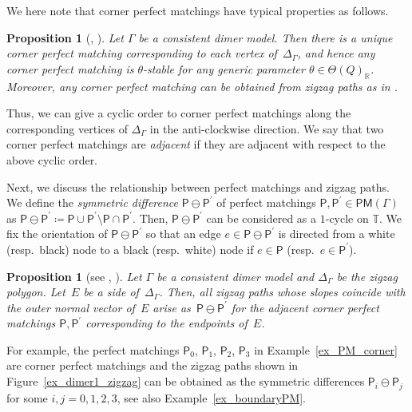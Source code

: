 \documentclass[10pt,a4paper]{amsart}
\numberwithin{equation}{section}
\newtheorem{Proposition}[Theorem]{Proposition}
\theoremstyle{definition}
\newcommand{\RR}{\mathbb{R}}
\newcommand{\TT}{\mathbb{T}}
\newcommand{\sfP}{\mathsf{P}}
\newcommand{\PM}{\mathsf{PM}}
\begin{document}
We here note that corner perfect matchings have typical properties as follows.

\begin{Proposition}[{\cite[Corollary~4.27]{Bro_dimer}, \cite[Proposition~9.2]{IU_special}}]
\label{prop_cPM_unique}
Let $\Gamma$ be a consistent dimer model.
Then there is a unique corner perfect matching corresponding to each vertex of~$\Delta_\Gamma$,
and hence any corner perfect matching is $\theta$-stable for any generic parameter $\theta\in\Theta(Q)_\RR$.
Moreover, any corner perfect matching can be obtained from zigzag paths as in {\rm \cite[\emph{Section}~8]{IU_special}}.
\end{Proposition}

Thus, we can give a cyclic order to corner perfect matchings along the corresponding vertices of $\Delta_\Gamma$ in the anti-clockwise direction.
We say that two corner perfect matchings are \emph{adjacent} if they are adjacent with respect to the above cyclic order.

Next, we discuss the relationship between perfect matchings and zigzag paths.
We define the \emph{symmetric difference} $\sfP\ominus\sfP^\prime$ of perfect matchings $\sfP, \sfP^\prime\in\PM(\Gamma)$ as
$\sfP\ominus\sfP^\prime\coloneqq\sfP\cup\sfP^\prime{\setminus}\sfP\cap\sfP^\prime$.
Then, $\sfP\ominus\sfP^\prime$ can be considered as a $1$-cycle on $\TT$.
We fix the orientation of $\sfP\ominus\sfP^\prime$ so that an edge $e\in \sfP\ominus\sfP^\prime$ is directed
from a white (resp.\ black) node to a black (resp.\ white) node if $e\in\sfP$ (resp.\ $e\in\sfP^\prime$).

\begin{Proposition} [{see \cite[Corollary~3.8]{Gul}, \cite[Step~1 of the proof of Proposition~9.2, Corollary~9.3]{IU_special}}]\label{zigzag_sidepolygon}
Let $\Gamma$ be a consistent dimer model and $\Delta_\Gamma$ be the zigzag polygon.
Let~$E$ be a side of~$\Delta_\Gamma$.
Then, all zigzag paths whose slopes coincide with the outer normal vector of~$E$ arise as~$\sfP\ominus\sfP^\prime$
for the adjacent corner perfect matchings $\sfP,\sfP^\prime$ corresponding to the endpoints of~$E$.
\end{Proposition}

For example, the perfect matchings $\sfP_0$, $\sfP_1$, $\sfP_2$, $\sfP_3$ in Example~\ref{ex_PM_corner} are corner perfect matchings and
the zigzag paths shown in Figure~\ref{ex_dimer1_zigzag} can be obtained as the symmetric differences $\sfP_i\ominus\sfP_j$ for some $i, j=0, 1, 2, 3$,
see also Example~\ref{ex_boundaryPM}.
\end{document}
